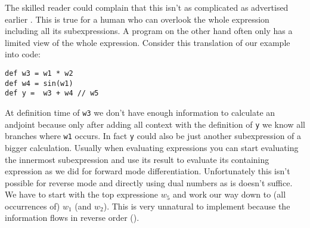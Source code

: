 The skilled reader could complain that this isn't as complicated as advertised \todowording earlier . This is true for a human who can overlook the whole expression including all its subexpressions. A program on the other hand often only has a limited view of the whole expression. Consider this translation of our example into code:
\begin{lstlisting}
def w3 = w1 * w2
def w4 = sin(w1)
def y =  w3 + w4 // w5
\end{lstlisting}
At definition time of \lstinline{w3} we don't have enough information to calculate an andjoint because only after adding all context with the definition of \lstinline{y} we know all branches where \lstinline{w1} occurs. In fact \lstinline{y} could also be just another subexpression of a bigger calculation. Usually when evaluating expressions you can start evaluating the innermost subexpression and use its result to evaluate its containing expression as we did for forward mode differentiation. Unfortunately this isn't possible for reverse mode and directly using dual numbers as is doesn't suffice. We have to start with the top expressione $w_5$ and work our way down to (all occurrences of) $w_1$ (and $w_2$). This is very unnatural to implement because the information flows in reverse order (). 
